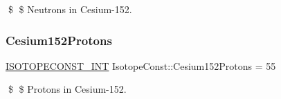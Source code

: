 \$ \$ Neutrons in Cesium-\/152. \mbox{\label{group___isotope_const-_cesium-_cs152_ga398109c0f16ce94f75d7459e6153bafd}} 
\subsubsection{\texorpdfstring{Cesium152\+Protons}{Cesium152Protons}}
{\footnotesize\ttfamily \mbox{\hyperlink{group___isotope_const-_macros_ga5f18360b3e99483a35c32d789e62621c}{I\+S\+O\+T\+O\+P\+E\+C\+O\+N\+S\+T\+\_\+\+I\+NT}} Isotope\+Const\+::\+Cesium152\+Protons = 55}

\$ \$ Protons in Cesium-\/152. 